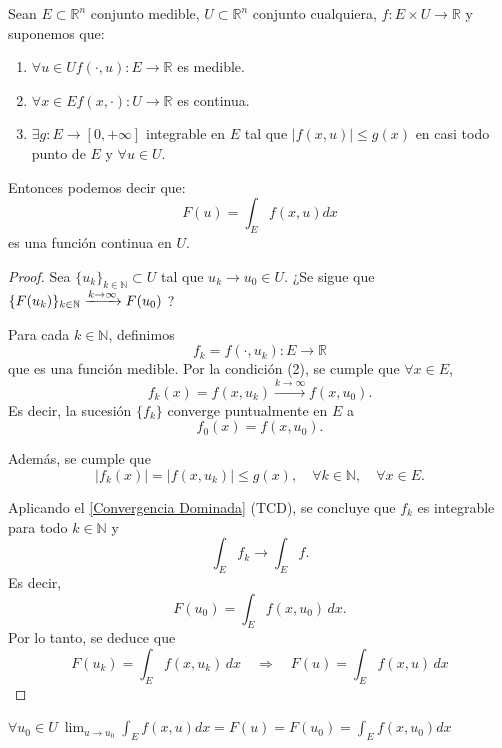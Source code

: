 \begin{teorema}
    Sean $E \subset \mathbb{R}^n$ conjunto medible, $U \subset \mathbb{R}^n$ conjunto cualquiera, $f: E \times U \to \mathbb{R}$ y suponemos que:
    \vspace{-0.5em}
    \begin{enumerate}
        \item $\forall u \in U f(\cdot, u): E \to \mathbb{R}$ es medible.
        \item $\forall x \in E f(x, \cdot): U \to \mathbb{R}$ es continua.
        \item $\exists g: E \to [0, +\infty]$ integrable en $E$ tal que $|f(x, u)| \leq g(x)$ en casi todo punto de $E$ y $\forall u \in U$.
    \end{enumerate}
    Entonces podemos decir que:
    $$ F(u) = \int_{E}f(x, u)dx $$ es una función continua en $U$.
\end{teorema}
\begin{proof}
    Sea \( \{ u_k \}_{k \in \mathbb{N}} \subset U \) tal que \( u_k \to u_0 \in U \).
    ¿Se sigue que \( \{ F(u_k) \}_{k \in \mathbb{N}} \xrightarrow{k \to \infty} F(u_0) \) ?

    Para cada \( k \in \mathbb{N} \), definimos
    \[
        f_k = f(\cdot, u_k): E \to \mathbb{R}
    \]
    que es una función medible. Por la condición (2), se cumple que \( \forall x
    \in E \),
    \[
        f_k(x) = f(x, u_k) \xrightarrow{k \to \infty} f(x, u_0).
    \]
    Es decir, la sucesión \( \{ f_k \} \) converge puntualmente en \( E \) a
    \[
        f_0(x) = f(x, u_0).
    \]

    Además, se cumple que
    \[
        |f_k(x)| = |f(x, u_k)| \leq g(x), \quad \forall k \in \mathbb{N}, \quad \forall x \in E.
    \]

    Aplicando el \cref{Convergencia Dominada} (TCD), se concluye que \( f_k \) es
    integrable para todo \( k \in \mathbb{N} \) y
    \[
        \int_E f_k \to \int_E f.
    \]
    Es decir,
    \[
        F(u_0) = \int_E f(x, u_0) \,dx.
    \]
    Por lo tanto, se deduce que
    \[
        F(u_k) = \int_E f(x, u_k) \,dx \quad \Rightarrow \quad F(u) = \int_E f(x, u) \,dx
    \]
\end{proof}
\begin{observación}
$\forall u_0 \in U \ \lim_{u \to u_0} \int_{E}f(x, u)dx = F(u) = F(u_0) = \int_{E}f(x, u_0)dx$
\end{observación}
